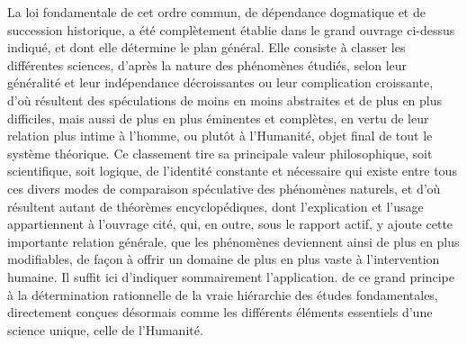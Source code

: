 \documentclass[french,twoside]{book} %
\begin{document}
La loi fondamentale de cet ordre commun, de dépendance dogmatique et de succession historique, a été complètement établie dans le grand ouvrage ci-dessus indiqué, et dont elle détermine le plan général. Elle consiste à classer les différentes sciences, d’après la nature des phénomènes étudiés, selon leur généralité et leur indépendance décroissantes ou leur complication croissante, d’où résultent des spéculations de moins en moins abstraites et de plus en plus difficiles, mais aussi de plus en plus éminentes et complètes, en vertu de leur relation plus intime à l’homme, ou plutôt à l’Humanité, objet final de tout le système théorique. Ce classement tire sa principale valeur philosophique, soit scientifique, soit logique, de l’identité constante et nécessaire qui existe entre tous ces divers modes de comparaison spéculative des phénomènes naturels, et d’où résultent autant de théorèmes encyclopédiques, dont l’explication et l’usage appartiennent à l’ouvrage cité, qui, en outre, sous le rapport actif, y ajoute cette importante relation générale, que les phénomènes deviennent ainsi de plus en plus modifiables, de façon à offrir un domaine de plus en plus vaste à l’intervention humaine. Il suffit ici d’indiquer sommairement l’application. de ce grand principe à la détermination rationnelle de la vraie hiérarchie des études fondamentales, directement conçues désormais comme les différents éléments essentiels d’une science unique, celle de l’Humanité.\par
\end{document}
